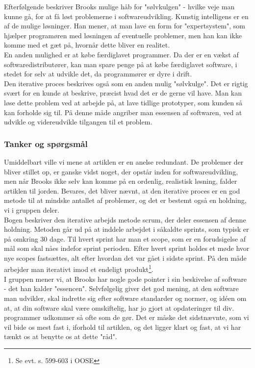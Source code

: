 \documentclass[11pt]{article}
\begin{document}
Efterfølgende beskriver Brooks mulige håb for "sølvkulgen" - hvilke veje man kunne gå, for at få løst problemerne i softwareudvikling. Kunstig intelligens er en af de mulige løsninger. Han mener, at man lave en form for "expertsystem", som hjælper programøren med løsningen af eventuelle problemer, men han kan ikke komme med et gæt på, hvornår dette bliver en realitet.\\
 En anden mulighed er at købe færdiglavet programmer. Da der er en vækst af softwaredistributører, kan man spare penge på at købe færdiglavet software, i stedet for selv at udvikle det, da programmører er dyre i drift.\\
Den iterative proces beskrives også som en anden mulig "sølvkulge". Det er rigtig svært for en kunde at beskrive, præcist hvad det er de gerne vil have. Man kan løse dette problem ved at arbejde på, at lave tidlige prototyper, som kunden så kan forholde sig til. På denne måde angriber man essensen af softwaren, ved at udvikle og videreudvikle tilgangen til et problem.
\subsubsection{Tanker og spørgsmål}
Umiddelbart ville vi mene at artiklen er en anelse redundant. De problemer der bliver stillet op, er ganske vidst noget, der opstår inden for softwareudvikling, men når Brooks ikke selv kan komme på en ordenlig, realistisk løsning, falder artiklen til jorden. Bevares, det bliver nævnt, at den iterative proces er en god metode til at mindske antallet af problemer, og det er bestemt også en holdning, vi i gruppen deler.\\
Bogen beskriver den iterative arbejds metode scrum, der deler essensen af denne holdning. Metoden går ud på at inddele arbejdet i såkaldte sprints, som typisk er på omkring 30 dage. Til hvert sprint har man et scope, som er en forudsigelse af mål som skal nåes indefor sprint perioden. Efter hvert sprint holdes et møde hvor nye scopes fastsættes, alt efter hvordan det var gået i sidste sprint. På den måde arbejder man iterativt imod et endeligt produkt\footnote{Se evt. s. 599-603 i OOSE\cite{OOSE}}.\\
I gruppen mener vi, at Brooks har nogle gode pointer i sin beskivelse af software - det han kalder "essencen". Selvfølgelig giver det god mening, at den software man udvikler, skal indrette sig efter software standarder og normer, og idéen om at, at din software skal være omskiftelig, har jo gjort at opdateringer til div. programmer udkommer så ofte som de gør. Det er måske det sidstnævnte, som vi vil bide os mest fast i, iforhold til artiklen, og det ligger klart og fast, at vi har tænkt os at benytte os at dette "råd".
\end{document}
